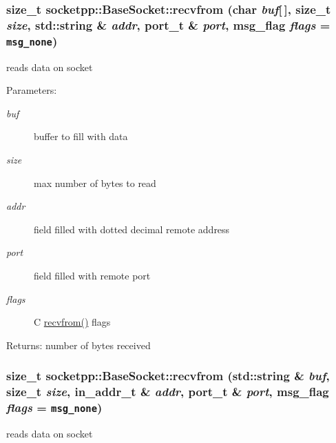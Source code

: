 \begin{CompactItemize}
{\subsubsection[{recvfrom}]{\setlength{\rightskip}{0pt plus 5cm}size\_\-t socketpp::BaseSocket::recvfrom (char {\em buf}\mbox{[}$\,$\mbox{]}, \/  size\_\-t {\em size}, \/  std::string \& {\em addr}, \/  port\_\-t \& {\em port}, \/  msg\_\-flag {\em flags} = {\tt msg\_\-none})}}
\label{classsocketpp_1_1BaseSocket_9cc42afe664fc31970e166a3b2ea0591}


reads data on socket 

\begin{Desc}
\item[Parameters:]
\begin{description}
\item[{\em buf}]buffer to fill with data \item[{\em size}]max number of bytes to read \item[{\em addr}]field filled with dotted decimal remote address \item[{\em port}]field filled with remote port \item[{\em flags}]C \hyperlink{classsocketpp_1_1BaseSocket_6a207860c0a1328dc05bea32bb62e81f}{recvfrom()} flags \end{description}
\end{Desc}
\begin{Desc}
\item[Returns:]number of bytes received \end{Desc}
\hypertarget{classsocketpp_1_1BaseSocket_8241347ca77942e2bb1449d117ac7248}{
\subsubsection[{recvfrom}]{\setlength{\rightskip}{0pt plus 5cm}size\_\-t socketpp::BaseSocket::recvfrom (std::string \& {\em buf}, \/  size\_\-t {\em size}, \/  in\_\-addr\_\-t \& {\em addr}, \/  port\_\-t \& {\em port}, \/  msg\_\-flag {\em flags} = {\tt msg\_\-none})}}
\label{classsocketpp_1_1BaseSocket_8241347ca77942e2bb1449d117ac7248}


reads data on socket 


\end{CompactItemize}

